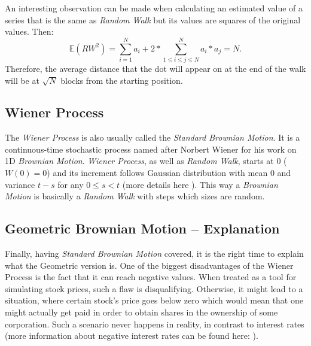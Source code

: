         An interesting observation can be made when calculating an estimated value of a series that is the same as \textit{Random Walk} but its values are squares of the original values.
        Then:
        \[
        \mathbb{E}({RW}^2) = \sum_{i=1}^{N} a_{i} + 2*\sum_{1 \leq i \leq j \leq N}^{N} a_{i}*a_{j} = N
        .
        \]
        Therefore, the average distance that the dot will appear on at the end of the walk will be at \(\sqrt{N}\) blocks from the starting position.
        
    \subsection{Wiener Process}
        The \textit{Wiener Process} is also usually called the \textit{Standard Brownian Motion}. It is a continuous-time stochastic process named after Norbert Wiener for his work on 1D \textit{Brownian Motion}.
        \textit{Wiener Process}, as well as \textit{Random Walk}, starts at 0 (\( W(0) = 0 \)) and its increment follows Gaussian distribution with mean \(0\) and variance \(t-s\) for any \(0\leq s < t \) (more details here \cite{wienerProcess}).
        This way a \textit{Brownian Motion} is basically a \textit{Random Walk} with steps which sizes are random.
    \subsection{Geometric Brownian Motion -- Explanation}
        Finally, having \textit{Standard Brownian Motion} covered, it is the right time to explain what the Geometric version is. One of the biggest disadvantages of the Wiener Process is the fact that it can reach negative values. When treated as a tool for simulating stock prices, such a flaw is disqualifying. Otherwise, it might lead to a situation, where certain stock's price goes below zero which would mean that one might actually get paid in order to obtain shares in the ownership of some corporation. Such a scenario never happens in reality, in contrast to interest rates (more information about negative interest rates can be found here: \cite{negativeInterestRates}).
        
